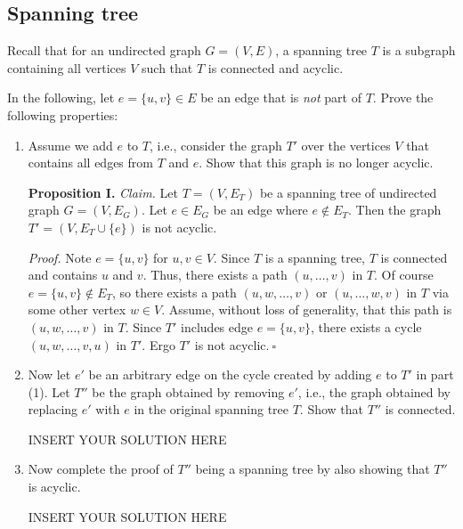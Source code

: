 \subsection{Spanning tree}

Recall that for an undirected graph $G = (V,E)$, a spanning tree $T$ is a subgraph containing all vertices $V$ such that $T$ is connected and acyclic. 

In the following, let $e=\{u,v\}\in E$ be an edge that is \emph{not} part of $T$.
Prove the following properties:

\begin{enumerate}
    \item Assume we add $e$ to $T$, i.e., consider the graph $T'$ over the vertices $V$ that contains all edges from $T$ and $e$. Show that this graph is no longer acyclic.

\begin{solution}
\textbf{Proposition I. }\textit{Claim. }Let $T=(V,E_T)$ be a spanning tree of undirected graph $G=(V,E_G)$. Let $e\in E_G$ be an edge where $e\notin E_T$. Then the graph $T'=(V,E_T\cup\{e\})$ is not acyclic.

\textit{Proof. }Note $e=\{u,v\}$ for $u,v\in V$. Since $T$ is a spanning tree, $T$ is connected and contains $u$ and $v$. Thus, there exists a path $(u,\dots,v)$ in $T$. Of course $e=\{u,v\}\notin E_T$, so there exists a path $(u,w,\dots,v)$ or $(u,\dots,w,v)$ in $T$ via some other vertex $w\in V$. Assume, without loss of generality, that this path is $(u,w,\dots,v)$ in $T$. Since $T'$ includes edge $e=\{u,v\}$, there exists a cycle $(u,w,\dots,v,u)$ in $T'$. Ergo $T'$ is not acyclic.$~\square$
\end{solution}

    \item Now let $e'$ be an arbitrary edge on the cycle created by adding $e$ to $T'$ in part (1). Let $T''$ be the graph obtained by removing $e'$, i.e., the graph obtained by replacing $e'$ with $e$ in the original spanning tree $T$. Show that $T''$ is connected.

\begin{solution}   INSERT YOUR SOLUTION HERE   \end{solution}

    \item Now complete the proof of $T''$ being a spanning tree by also showing that $T''$ is acyclic.

\begin{solution}   INSERT YOUR SOLUTION HERE   \end{solution}
\end{enumerate}